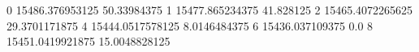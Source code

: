 0 15486.376953125 50.33984375
1 15477.865234375 41.828125
2 15465.4072265625 29.3701171875
4 15444.0517578125 8.0146484375
6 15436.037109375 0.0
8 15451.0419921875 15.0048828125

